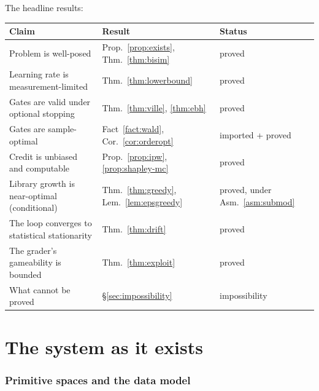 \documentclass[11pt]{article}
\theoremstyle{plain}
\theoremstyle{definition}
\theoremstyle{remark}
\begin{document}
The headline results:
\begin{center}
\begin{tabular}{@{}lll@{}}
\toprule
Claim & Result & Status \\
\midrule
Problem is well-posed & Prop.~\ref{prop:exists}, Thm.~\ref{thm:bisim} & proved \\
Learning rate is measurement-limited & Thm.~\ref{thm:lowerbound} & proved \\
Gates are valid under optional stopping & Thm.~\ref{thm:ville}, \ref{thm:ebh} & proved \\
Gates are sample-optimal & Fact~\ref{fact:wald}, Cor.~\ref{cor:orderopt} & imported + proved \\
Credit is unbiased and computable & Prop.~\ref{prop:ipw}, \ref{prop:shapley-mc} & proved \\
Library growth is near-optimal (conditional) & Thm.~\ref{thm:greedy}, Lem.~\ref{lem:epsgreedy} & proved, under Asm.~\ref{asm:submod} \\
The loop converges to statistical stationarity & Thm.~\ref{thm:drift} & proved \\
The grader's gameability is bounded & Thm.~\ref{thm:exploit} & proved \\
What cannot be proved & \S\ref{sec:impossibility} & impossibility \\
\bottomrule
\end{tabular}
\end{center}

\part{The system as it exists}

\section{Primitive spaces and the data model}\label{sec:primitives}
\end{document}
